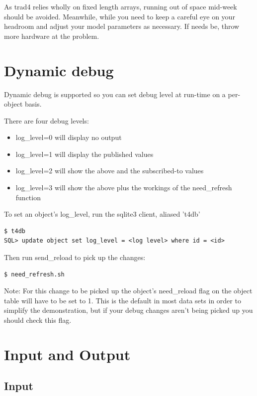 \documentclass{report}
\begin{document}
As trad4 relies wholly on fixed length arrays, running out of space mid-week should be avoided.  Meanwhile, while you need to keep a careful eye on your headroom and adjust your model parameters as necessary. If needs be, throw more hardware at the problem.

\section{Dynamic debug}

Dynamic debug is supported so you can set debug level at run-time on a per-object basis. 

There are four debug levels:

\begin{itemize}
\item log_level=0 will display no output
\item log_level=1 will display the published values
\item log_level=2 will show the above and the subscribed-to values
\item log_level=3 will show the above plus the workings of the need_refresh function
\end{itemize}

To set an object's log_level, run the sqlite3 client, aliased 't4db'

\begin{verbatim}
$ t4db
SQL> update object set log_level = <log level> where id = <id>
\end{verbatim}

Then run send_reload to pick up the changes:

\begin{verbatim}
$ need_refresh.sh
\end{verbatim}

Note: For this change to be picked up the object's need_reload flag on the object table will have to be set to 1. This is the default in most data sets in order to simplify the demonstration, but if your debug changes aren't being picked up you should check this flag.

\section{Input and Output}

\subsection{Input}
\end{document}
